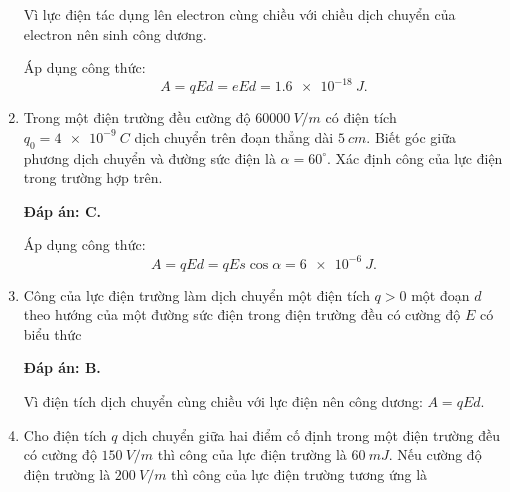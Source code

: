 \begin{enumerate}[label=\bfseries Câu \arabic*:]
{		Vì lực điện tác dụng lên electron cùng chiều với chiều dịch chuyển của electron nên sinh công dương.
		
		Áp dụng công thức:
		$$A=qEd=eEd = \SI{1.6e-18}{J}.$$
	}
	\item {}
	
	\cauhoi
	{Trong một điện trường đều cường độ $\SI{60000}{V/m}$ có điện tích $q_0=\SI{4e-9}{C}$ dịch chuyển trên đoạn thẳng dài $\SI{5}{cm}$. Biết góc giữa phương dịch chuyển và đường sức điện là $\alpha = 60^\circ$. Xác định công của lực điện trong trường hợp trên.
		
	}
	\loigiai
	{	\textbf{Đáp án: C.}
		
		Áp dụng công thức:
		$$A=qEd=qEs \cos \alpha = \SI{6e-6}{J}.$$
	}
	\item {}
	
	\cauhoi
	{Công của lực điện trường làm dịch chuyển một điện tích $q>0$ một đoạn $d$ theo hướng của một đường sức điện trong điện trường đều có cường độ $E$ có biểu thức
		
	}
	\loigiai
	{	\textbf{Đáp án: B.}
		
		Vì điện tích dịch chuyển cùng chiều với lực điện nên công dương: $A=qEd$.
	}
	\item {}
	
	\cauhoi
	{Cho điện tích $q$ dịch chuyển giữa hai điểm cố định trong một điện trường đều có cường độ $\SI{150}{V/m}$ thì công của lực điện trường là $\SI{60}{mJ}$. Nếu cường độ điện trường là $\SI{200}{V/m}$ thì công của lực điện trường tương ứng là
		
}
\end{enumerate}
